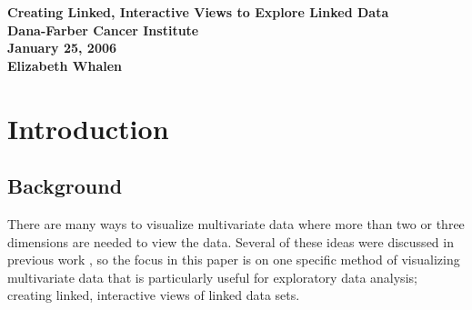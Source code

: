 \documentclass{article}[11pt]
\begin{document}



\begin{titlepage}
\begin{center}
\Large
\vspace*{1in}
\textbf{Creating Linked, Interactive Views to \linebreak Explore Linked Data} \\
\vspace{1in}
\textbf{Dana-Farber Cancer Institute}\\ 
\textbf{January 25, 2006} \\
\vspace{1in} 
\textbf{Elizabeth Whalen} \\
\end{center}
\end{titlepage}
\normalsize
\newpage

\section{Introduction}\label{Sec:Intro}

\subsection{Background}\label{Ssec:Backg}

There are many ways to visualize multivariate data where more than
two or three dimensions are needed to view the data.  Several of these ideas
were discussed in previous work \cite{EW05}, so the focus in this paper
is on one specific method of visualizing multivariate data that is
particularly useful for exploratory data analysis; creating linked,
interactive views of linked data sets.  
\end{document}
